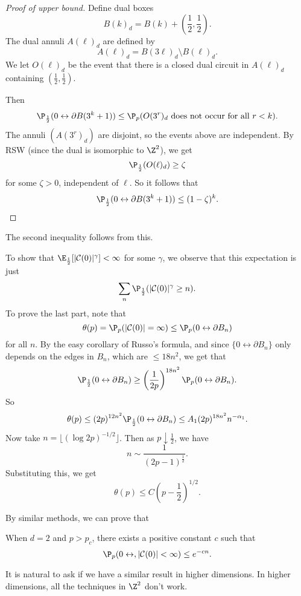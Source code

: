 \documentclass[a4paper]{article}
\begin{document}
\begin{proof}[Proof of upper bound]
  Define dual boxes
  \[
    B(k)_d = B(k) + \left(\frac{1}{2}, \frac{1}{2}\right).
  \]
  The dual annuli $A(\ell)_d$ are defined by
  \[
    A(\ell)_d = B(3\ell)_d \setminus B(\ell)_d.
  \]
  We let $O(\ell)_d$ be the event that there is a closed dual circuit in $A(\ell)_d$ containing $\left(\frac{1}{2}, \frac{1}{2}\right)$.

  Then
  \[
    \P_{\frac{1}{2}} (0 \leftrightarrow \partial B(3^k + 1)) \leq \P_p(O(3^r)_d\text{ does not occur for all }r < k).
  \]
  The annuli $(A(3^r)_d)$ are disjoint, so the events above are independent. By RSW (since the dual is isomorphic to $\Z^2$), we get
  \[
    \P_{\frac{1}{2}}(O(\ell)_d) \geq \zeta
  \]
  for some $\zeta > 0$, independent of $\ell$. So it follows that
  \[
    \P_{\frac{1}{2}}(0 \leftrightarrow \partial B(3^k + 1)) \leq (1 - \zeta)^k.\qedhere
  \]
\end{proof}

The second inequality follows from this.

To show that $\E_{\frac{1}{2}}[|\mathcal{C}(0)|^\gamma] < \infty$ for some $\gamma$, we observe that this expectation is just
\[
  \sum_n \P_{\frac{1}{2}}(|\mathcal{C}(0)|^\gamma \geq n).
\]
To prove the last part, note that
\[
  \theta(p) = \P_p(|\mathcal{C}(0)| = \infty) \leq \P_p(0 \leftrightarrow \partial B_n)
\]
for all $n$. By the easy corollary of Russo's formula, and since $\{0 \leftrightarrow \partial B_n\}$ only depends on the edges in $B_n$, which are $\leq 18 n^2$, we get that
\[
  \P_{\frac{1}{2}}(0 \leftrightarrow \partial B_n) \geq \left(\frac{1}{2p}\right)^{18n^2}\P_p(0 \leftrightarrow \partial B_n).
\]
So
\[
  \theta(p) \leq (2p)^{12n^2} \P_{\frac{1}{2}}(0 \leftrightarrow \partial B_n) \leq A_1 (2p)^{18n^2} n^{-\alpha_1}.
\]
Now take $n = \lfloor (\log 2p)^{-1/2} \rfloor $. Then as $p \downarrow \frac{1}{2}$, we have
\[
  n \sim \frac{1}{(2p - 1)^{\frac{1}{2}}}.
\]
Substituting this, we get
\[
  \theta(p) \leq C \left(p - \frac{1}{2}\right)^{1/2}.
\]

By similar methods, we can prove that
\begin{thm}
  When $d = 2$ and $p > p_c$, there exists a positive constant $c$ such that
  \[
    \P_p(0 \leftrightarrow, |\mathcal{C}(0)| < \infty) \leq e^{-cn}.
  \]
\end{thm}

It is natural to ask if we have a similar result in higher dimensions. In higher dimensions, all the techniques in $\Z^2$ don't work.
\end{document}
